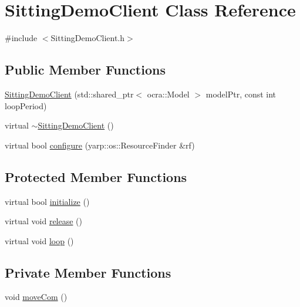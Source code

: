 \hypertarget{classSittingDemoClient}{\section{\-Sitting\-Demo\-Client \-Class \-Reference}
\label{classSittingDemoClient}
}


{\ttfamily \#include $<$\-Sitting\-Demo\-Client.\-h$>$}

\subsection*{\-Public \-Member \-Functions}
\begin{DoxyCompactItemize}
\item 
\hyperlink{classSittingDemoClient_aedcb6c4ad7b4fa19f1b188e700c0a079}{\-Sitting\-Demo\-Client} (std\-::shared\-\_\-ptr$<$ ocra\-::\-Model $>$ model\-Ptr, const int loop\-Period)
\item 
virtual \hyperlink{classSittingDemoClient_a0fb7ded5e44b2b60d7f89c22386154b7}{$\sim$\-Sitting\-Demo\-Client} ()
\item 
virtual bool \hyperlink{classSittingDemoClient_ac5c38beccb24fdc5d6aa0104111e4dfe}{configure} (yarp\-::os\-::\-Resource\-Finder \&rf)
\end{DoxyCompactItemize}
\subsection*{\-Protected \-Member \-Functions}
\begin{DoxyCompactItemize}
\item 
virtual bool \hyperlink{classSittingDemoClient_aff04405d690f2ae8abbd05ea4b55b64d}{initialize} ()
\item 
virtual void \hyperlink{classSittingDemoClient_a18d30d70a9b17e8f64f87f5cb01b746e}{release} ()
\item 
virtual void \hyperlink{classSittingDemoClient_ad08cf3328c8a4f22a1677b5ad67de645}{loop} ()
\end{DoxyCompactItemize}
\subsection*{\-Private \-Member \-Functions}
\begin{DoxyCompactItemize}
\item 
void \hyperlink{classSittingDemoClient_a726a1a1fa46624190532342233a6cdf4}{move\-Com} ()
\end{DoxyCompactItemize}
